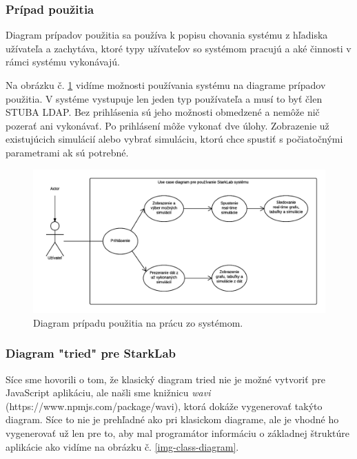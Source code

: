 \subsubsection{Prípad použitia}
Diagram prípadov použitia sa používa k popisu chovania systému z hľadiska užívateľa a zachytáva, ktoré typy užívateľov so systémom pracujú a aké činnosti v rámci systému vykonávajú.\cite{uml-usecase}

Na obrázku č. \ref{img-use-case} vidíme možnosti používania systému na diagrame prípadov použitia. V systéme vystupuje len jeden typ používateľa a musí to byť člen STUBA LDAP. Bez prihlásenia sú jeho možnosti obmedzené a nemôže nič pozerať ani vykonávať. Po prihlásení môže vykonať dve úlohy. Zobrazenie už existujúcich simulácií alebo vybrať simuláciu, ktorú chce spustiť s počiatočnými parametrami ak sú potrebné.

\begin{figure}[H]
  \centering
  \includegraphics[scale=0.7]{img/diagrams/use-case.png}
  \caption{Diagram prípadu použitia na prácu zo systémom.}
  \label{img-use-case}
\end{figure}

\subsubsection{Diagram "tried" pre StarkLab}
Síce sme hovorili o tom, že klasický diagram tried nie je možné vytvoriť pre JavaScript aplikáciu, ale našli sme knižnicu \textit{wavi} (https://www.npmjs.com/package/wavi), ktorá dokáže vygenerovať takýto diagram. Síce to nie je prehľadné ako pri klasickom diagrame, ale je vhodné ho vygenerovať už len pre to, aby mal programátor informáciu o základnej štruktúre aplikácie ako vidíme na obrázku č. \ref{img-class-diagram}.

